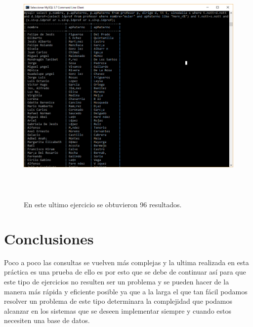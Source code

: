 \documentclass[12pt, titlepage]{article}
\begin{document}
	\begin{figure}[H]
		\begin{center}
			\includegraphics[width=16cm, height=12cm]{img/ultimo.png}
			\caption{En este ultimo ejercicio se obtuvieron 96 resultados.} 
			\label{fig:ultimo}
		\end{center}
	\end{figure}
	\section{Conclusiones}
	Poco a poco las consultas se vuelven más complejas y la ultima realizada en esta práctica es una prueba de ello es por esto que se debe de continuar así para que este tipo de ejercicios no resulten ser un problema y se pueden hacer de la manera más rápida y eficiente posible ya que a la larga el que tan fácil podamos resolver un problema de este tipo determinara la complejidad que podamos alcanzar en los sistemas que se deseen implementar siempre y cuando estos necesiten una base de datos.
	 
	
\end{document}
